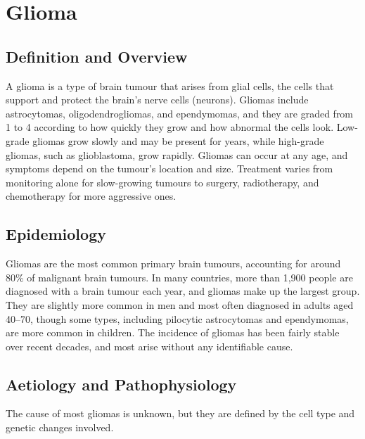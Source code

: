 \chapter{Glioma}

\section*{Definition and Overview}
A glioma is a type of brain tumour that arises from glial cells, the cells that support and protect the brain's nerve cells (neurons). Gliomas include astrocytomas, oligodendrogliomas, and ependymomas, and they are graded from 1 to 4 according to how quickly they grow and how abnormal the cells look. Low-grade gliomas grow slowly and may be present for years, while high-grade gliomas, such as glioblastoma, grow rapidly. Gliomas can occur at any age, and symptoms depend on the tumour's location and size. Treatment varies from monitoring alone for slow-growing tumours to surgery, radiotherapy, and chemotherapy for more aggressive ones.

\section*{Epidemiology}
Gliomas are the most common primary brain tumours, accounting for around 80\% of malignant brain tumours. In many countries, more than 1,900 people are diagnosed with a brain tumour each year, and gliomas make up the largest group. They are slightly more common in men and most often diagnosed in adults aged 40--70, though some types, including pilocytic astrocytomas and ependymomas, are more common in children. The incidence of gliomas has been fairly stable over recent decades, and most arise without any identifiable cause.

\section*{Aetiology and Pathophysiology}
The cause of most gliomas is unknown, but they are defined by the cell type and genetic changes involved.


